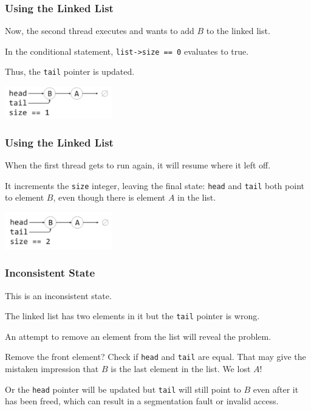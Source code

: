 \begin{frame}
\frametitle{Using the Linked List}

Now, the second thread executes and wants to add $B$ to the linked list. 

In the conditional statement, \texttt{list->size == 0} evaluates to true. 

Thus, the \texttt{tail} pointer is updated.

\begin{center}
\includegraphics[width=0.35\textwidth]{images/linkedlist2.png}
\end{center}


\end{frame}

\begin{frame}
\frametitle{Using the Linked List}

When the first thread gets to run again, it will resume where it left off. 

It increments the \texttt{size} integer, leaving the final state: \texttt{head} and \texttt{tail} both point to element $B$, even though there is element $A$ in the list.

\begin{center}
\includegraphics[width=0.35\textwidth]{images/linkedlist3.png}
\end{center}


\end{frame}

\begin{frame}
\frametitle{Inconsistent State}

This is an \alert{inconsistent state}.

The linked list has two elements in it but the \texttt{tail} pointer is wrong. 

An attempt to remove an element from the list will reveal the problem.

Remove the front element? Check if \texttt{head} and \texttt{tail} are equal. That may give the mistaken impression that $B$ is the last element in the list. We lost $A$!

Or the \texttt{head} pointer will be updated but \texttt{tail} will still point to $B$ even after it has been freed, which can result in a segmentation fault or invalid access.


\end{frame}

